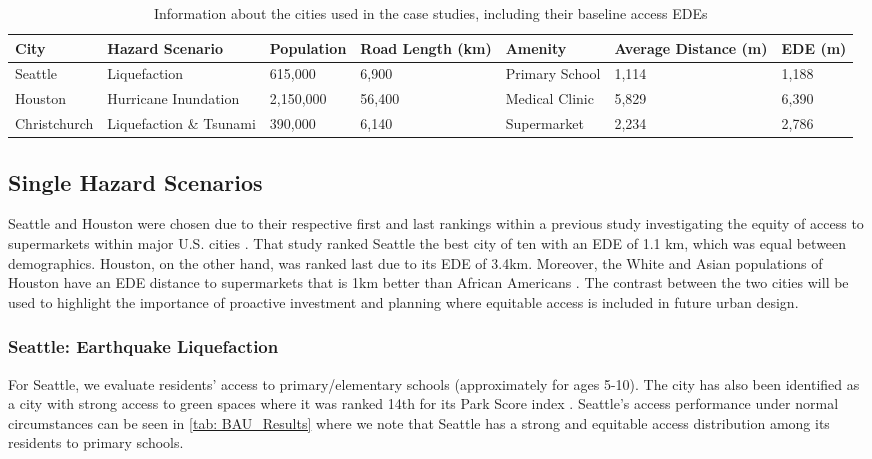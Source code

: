 \documentclass[review,3p,times,onecolumn,sort&compress,12pt]{elsarticle}
\let \cite \parencite
\begin{document}
\begin{table}[h!]
\small
\caption{Information about the cities used in the case studies, including their baseline access EDEs}
\label{tab: BAU_Results}
\begin{tabular}{p{1.8cm}|p{3.5cm}|R{1.8cm}|R{1cm}|p{2.25cm}|R{1.5cm}|R{1.5cm}}%
\hline
\textbf{City} & \textbf{Hazard Scenario} & \textbf{Population} & \textbf{Road Length (km)} & \textbf{Amenity} & \textbf{Average Distance (m)} & \textbf{EDE (m)} \\
\hline
Seattle & Liquefaction & 615,000 & 6,900 & Primary School & 1,114 & 1,188 \\
Houston & Hurricane Inundation & 2,150,000 & 56,400 & Medical Clinic & 5,829 & 6,390 \\
Christchurch & Liquefaction \& Tsunami & 390,000 & 6,140 & Supermarket & 2,234 & 2,786 \\
\hline
\end{tabular}
\end{table}

\subsection{Single Hazard Scenarios}
Seattle and Houston were chosen due to their respective first and last rankings within a previous study investigating the equity of access to supermarkets within major U.S. cities \cite{Logan2021-ineq}. 
That study ranked Seattle the best city of ten with an EDE of 1.1 km, which was equal between demographics. 
Houston, on the other hand, was ranked last due to its EDE of 3.4km.
Moreover, the White and Asian populations of Houston have an EDE distance to supermarkets that is 1km better than African Americans \cite{Logan2021-ineq}. 
The contrast between the two cities will be used to highlight the importance of proactive investment and planning where equitable access is included in future urban design.

\subsubsection{Seattle: Earthquake Liquefaction}
For Seattle, we evaluate residents' access to primary/elementary schools (approximately for ages 5-10).
The city has also been identified as a city with strong access to green spaces where it was ranked 14th for its Park Score index \cite{The_Trust_for_Public_Land2018-cm}.
Seattle's access performance under normal circumstances can be seen in \autoref{tab: BAU_Results} where we note that Seattle has a strong and equitable access distribution among its residents to primary schools.
\end{document}
